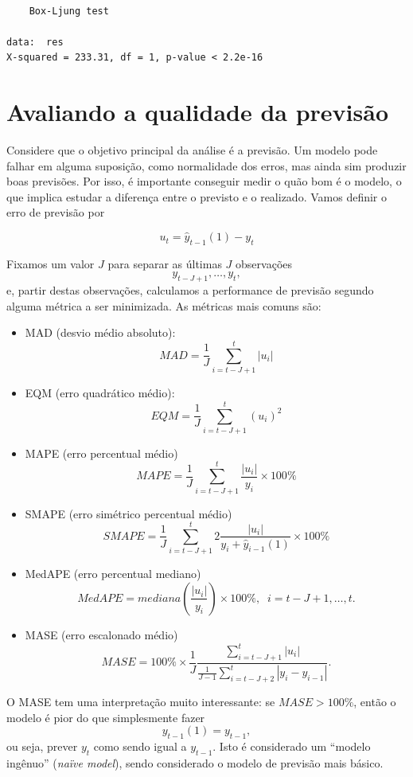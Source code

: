 \documentclass[
  letterpaper,
  DIV=11,
  numbers=noendperiod]{scrreprt}
\providecommand{\tightlist}{%
  \setlength{\itemsep}{0pt}\setlength{\parskip}{0pt}}\usepackage{longtable,booktabs,array}
\theoremstyle{definition}
\theoremstyle{plain}
\theoremstyle{definition}
\theoremstyle{plain}
\theoremstyle{remark}
\begin{document}
\begin{verbatim}

    Box-Ljung test

data:  res
X-squared = 233.31, df = 1, p-value < 2.2e-16
\end{verbatim}

\hypertarget{avaliando-a-qualidade-da-previsuxe3o}{%
\section{Avaliando a qualidade da
previsão}\label{avaliando-a-qualidade-da-previsuxe3o}}

Considere que o objetivo principal da análise é a previsão. Um modelo
pode falhar em alguma suposição, como normalidade dos erros, mas ainda
sim produzir boas previsões. Por isso, é importante conseguir medir o
quão bom é o modelo, o que implica estudar a diferença entre o previsto
e o realizado. Vamos definir o erro de previsão por

\[u_{t} =\hat{y}_{t-1}(1)-y_{t}\]

Fixamos um valor \(J\) para separar as últimas \(J\) observações
\[y_{t-J+1},\ldots,y_{t},\] e, partir destas observações, calculamos a
performance de previsão segundo alguma métrica a ser minimizada. As
métricas mais comuns são:

\begin{itemize}
\tightlist
\item
  MAD (desvio médio absoluto):
  \[MAD = \frac{1}{J}\sum_{i=t-J+1}^t |u_i|\]
\item
  EQM (erro quadrático médio):
  \[EQM = \frac{1}{J}\sum_{i=t-J+1}^t (u_i)^2\]
\item
  MAPE (erro percentual médio)
  \[MAPE = \frac{1}{J}\sum_{i=t-J+1}^t \frac{|u_i|}{y_i}\times 100\%\]
\item
  SMAPE (erro simétrico percentual médio)
  \[SMAPE = \frac{1}{J}\sum_{i=t-J+1}^t 2\frac{|u_i|}{y_i+\hat{y}_{i-1}(1)}\times 100\%\]
\item
  MedAPE (erro percentual mediano)
  \[MedAPE = mediana\left(\frac{|u_i|}{y_i}\right) \times 100\%,\;\;i=t-J+1,\ldots,t.\]
\item
  MASE (erro escalonado médio)
  \[MASE = 100\%\times\frac{1}{J} \frac{\sum_{i = t-J+1}^t|u_i|}{\frac{1}{J-1}\sum_{i=t-J+2}^t |y_i - y_{i-1}|}.\]
\end{itemize}

O MASE tem uma interpretação muito interessante: se \(MASE>100\%\),
então o modelo é pior do que simplesmente fazer \[y_{t-1}(1)=y_{t-1},\]
ou seja, prever \(y_t\) como sendo igual a \(y_{t-1}\). Isto é
considerado um ``modelo ingênuo'' (\emph{naïve model}), sendo
considerado o modelo de previsão mais básico.
\end{document}
